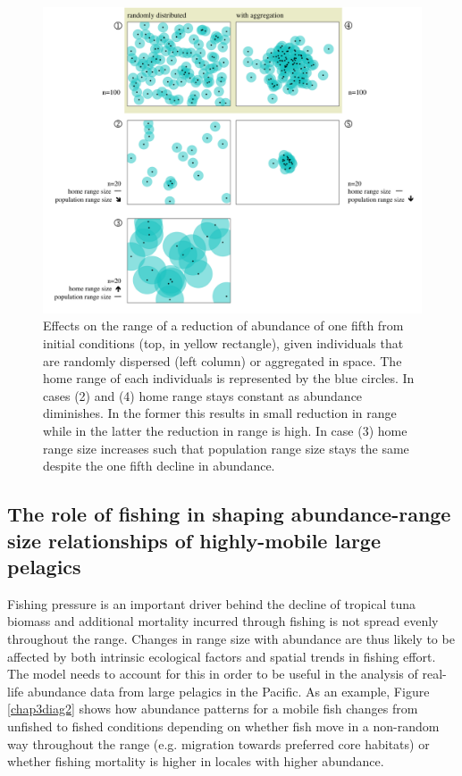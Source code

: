 \documentclass{article}
\begin{document}
\begin{figure}[!h]
\begin{center}
\includegraphics[scale=0.75]{PhD_ResearchProposal_DiagramAreaAbundanceHomeRange2.png}
\caption{Effects on the range of a reduction of abundance of one fifth from
  initial conditions (top, in yellow rectangle), given individuals
  that are randomly dispersed (left column) or aggregated in
  space. The home range of each individuals is represented by the blue
  circles. In cases (2) and (4) home range stays constant as abundance
  diminishes. In the former this results in small reduction in range
  while in the latter the reduction in range is high. In case (3) home
  range size increases such that population range size stays the same
  despite the one fifth decline in abundance. \label{figmov}
}
\end{center}
\end{figure}

\subsection{The role of fishing in shaping abundance-range size relationships
 of highly-mobile large pelagics}

Fishing pressure is an important driver behind the decline of tropical
tuna biomass and additional mortality incurred through fishing
is not spread evenly throughout the range. Changes in range size with
abundance are thus likely to be affected by both intrinsic
ecological factors and spatial trends in fishing effort. The model
needs to account for this in order to be useful in the analysis of
real-life abundance data from large pelagics in the Pacific. As an
example, Figure
\ref{chap3diag2} shows how abundance patterns for a mobile
fish changes from unfished to fished conditions depending on whether
fish move in a non-random way throughout the range (e.g. migration
towards preferred core habitats) or whether fishing mortality is
higher in locales with higher abundance.
\end{document}
